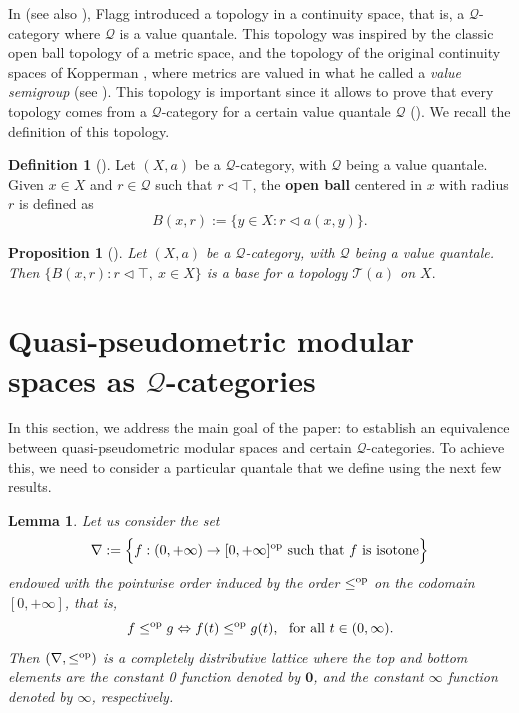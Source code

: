\documentclass[11pt,a4paper]{amsart}
\newtheorem{lemma}[theorem]{Lemma}
\newtheorem{proposition}[theorem]{Proposition}
\theoremstyle{definition}
\newtheorem{definition}[theorem]{Definition}
\begin{document}
	
	In \cite{Flagg97} (see also \cite{CookWeiss21}), Flagg introduced a topology in a continuity space, that is, a $\mathscr{Q}$-category where $\mathscr{Q}$ is a value quantale. This topology was inspired by the classic open ball topology of a metric space, and the topology of the original continuity spaces of Kopperman \cite{Kopp88}, where metrics are valued in what he called a \emph{value semigroup} (see \cite{CookWeiss21}). This topology is important since it allows to prove that every topology comes from a $\mathscr{Q}$-category for a certain value quantale $\mathscr{Q}$ (\cite{CookWeiss21,Flagg97}). We recall the definition of this topology.
	
	\begin{definition}[\cite{Flagg97,FlaggKopp97}]
		Let $(X,a)$ be a $\mathscr{Q}$-category, with $\mathscr{Q}$ being a value quantale. Given $x\in X$ and $r\in\mathscr{Q}$ such that $r\lhd\top$, the \textbf{open ball} centered in $x$ with radius $r$ is defined as
		\[B(x,r):=\{y\in X: r\lhd a(x,y)\}.\]
	\end{definition}
	
	\begin{proposition}[\cite{Flagg97,FlaggKopp97}]\label{prop: base open balls quantale}
		Let $(X,a)$ be a $\mathscr{Q}$-category, with $\mathscr{Q}$ being a value quantale. Then $\{B(x,r): r\lhd\top,\ x\in X\}$ is a base for a topology $\mathcal{T}(a)$ on $X.$
	\end{proposition}
	
	\color{black}
	
	\section{Quasi-pseudometric modular spaces as $\mathscr{Q}$-categories}\label{sec:final}
	
	In this section, we address the main goal of the paper: to establish an equi\-valence between quasi-pseudometric modular spaces and certain $\mathscr{Q}$-categories. To achieve this, we need to consider a particular quantale that we define using the next few results.
	
	\begin{lemma}\label{lem:deltacd}
		Let us consider the set
		$$\nabla:=\Big\{f:(0,+\infty)\to[0,+\infty]^\text{\normalfont op}\text{ such that } f\text{ is isotone}\Big\}$$ endowed with the pointwise order induced by the order $\leq^\text{\normalfont op}$ on the codomain $[0,+\infty]$, that is,
		\[f\leq^\text{\normalfont op}g\Leftrightarrow f(t)\leq^\text{\normalfont op}g(t),\ \text{ for all } t\in(0,\infty).\]
		Then $(\nabla,\leq^\text{\normalfont op})$ is a completely distributive lattice where the top and bottom elements are
		the constant 0 function denoted by $\mathbf{0}$, and the constant $\infty$ function denoted by $\boldsymbol{\infty}$, respectively.
	\end{lemma}
	
\end{document}
